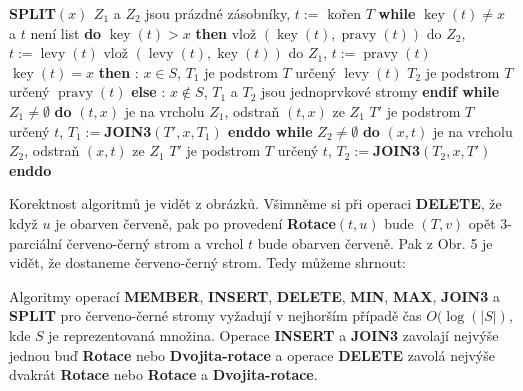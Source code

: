 \documentclass[a4paper,12pt]{article}
\DeclareMathOperator*{\levy}{levy}
\DeclareMathOperator*{\pravy}{pravy}
\DeclareMathOperator*{\key}{key}
\begin{document}
{\bf SPLIT$(x)$\newline 
$Z_1$} a $Z_2$ jsou prázdné zásobníky, $t:=\text{ kořen }T$\newline 
{\bf while} $\key(t)\ne x$ a $t$ není list {\bf do}\newline 
\phantom{---}{\bf if} $\key(t)>x$ {\bf then}\newline 
\phantom{------}vlož $(\key(t),\pravy(t))$ do $Z_2$, $t:=\levy(t)$ \newline 
\phantom{---}{\bf else}\newline 
\phantom{------}vlož $(\levy(t),\key(t))$ do $Z_1$, $t:=\pravy(t)$ \newline 
\phantom{---}{\bf endif\newline 
enddo \newline 
if} $\key(t)=x$ {\bf then}\newline 
\phantom{---}{\bf Výstup}: $x\in S$, $T_1$ je podstrom $T$ určený $\levy(t)$ \newline 
\phantom{---}$T_2$ je podstrom $T$ určený $\pravy(t)$ \newline 
{\bf else}\newline 
\phantom{---}{\bf Výstup}: $x\notin S$, $T_1$ a $T_2$ jsou jednoprvkové stromy\newline 
{\bf endif \newline 
while} $Z_1\ne\emptyset$ {\bf do}\newline 
\phantom{---}$(t,x)$ je na vrcholu $Z_1$, odstraň $(t,x)$ ze $Z_1$ \newline 
\phantom{---}$T'$ je podstrom $T$ určený $t$, $T_1:=${\bf JOIN3$(T',x,T_1
)$ \newline 
enddo\newline 
while} $Z_2\ne\emptyset$ {\bf do}\newline 
\phantom{---}$(x,t)$ je na vrcholu $Z_2$, odstraň $(x,t)$ ze $Z_1$ \newline 
\phantom{---}$T'$ je podstrom $T$ určený $t$, $T_2:=${\bf JOIN3$(T_2,x,T'
)$ \newline 
enddo}

Korektnost algoritmů je vidět z 
obrázků. Všimněme si při ope\-raci {\bf DELETE}, že když $
u$ je 
obarven červeně, pak po provedení {\bf Rotace$(t,u)$} bude $
(T,v)$ opět 
3-parciální červeno-černý strom a vrchol $t$ bude obarven červeně.  
Pak z Obr.  5 je vidět, že dostaneme červeno-černý 
strom. Tedy můžeme shrnout:

\begin{veta}Algoritmy operací {\bf MEMBER}, {\bf INSERT}, 
{\bf DE\-LE\-TE}, {\bf MIN}, {\bf MAX}, {\bf JOIN3} a {\bf SPLIT} pro červeno-černé 
stro\-my vyžadují v nejhorším případě čas $O
(\log(|S|)$, kde $S$ je 
reprezentovaná množina.  Operace {\bf INSERT} a {\bf JOIN3} zavolají 
nejvýše jednou buď {\bf Rotace} nebo {\bf Dvojita-rota\-ce} a operace 
{\bf DE\-LE\-TE} zavolá nejvýše dvakrát {\bf Rotace} nebo {\bf Rotace} a 
{\bf Dvojita-ro\-ta\-ce}.  
\end{veta}
\end{document}
